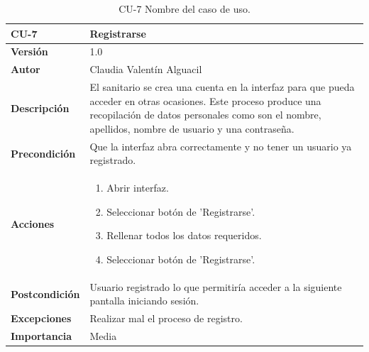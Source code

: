 \begin{table}[p]
	\centering
	\begin{tabularx}{\linewidth}{ p{} p{} }
		\toprule
		\textbf{CU-7}    & \textbf{Registrarse}\\
		\toprule
		\textbf{Versión}              & 1.0    \\
		\textbf{Autor}                & Claudia Valentín Alguacil \\
		 
		\textbf{Descripción}          & El sanitario se crea una cuenta en la interfaz para que pueda acceder en otras ocasiones. Este proceso produce una recopilación de datos personales como son el nombre, apellidos, nombre de usuario y una contraseña. \\
		\textbf{Precondición}         & Que la interfaz abra correctamente y no tener un usuario ya registrado. \\
		\textbf{Acciones}             &
		\begin{enumerate}
			\def\labelenumi{\arabic{enumi}.}
			\tightlist
			\item Abrir interfaz.
			\item Seleccionar botón de 'Registrarse'.
                \item Rellenar todos los datos requeridos.
                \item Seleccionar botón de 'Registrarse'.
		\end{enumerate}\\
		\textbf{Postcondición}        &  Usuario registrado lo que permitiría acceder a la siguiente pantalla iniciando sesión. \\
		\textbf{Excepciones}          & Realizar mal el proceso de registro. \\
		\textbf{Importancia}          & Media \\
		\bottomrule
	\end{tabularx}
	\caption{CU-7 Nombre del caso de uso.}
\end{table}

